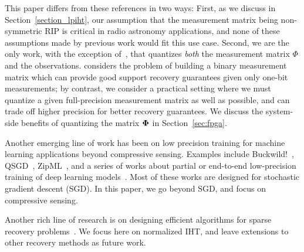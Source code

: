 \documentclass{article}
\begin{document}
{This paper differs from these references
in two ways: First, as we discuss in Section~\ref{section_lpiht},
our assumption that the measurement matrix being
non-symmetric RIP is critical in radio astronomy applications, 
and none of these assumptions made by previous work would fit  this use case. Second, we are the only work,
with the exception of~\cite{gopi20131bitcs}, that quantizes
{\em both} the measurement matrix $\Phi$ and the observations.
\cite{gopi20131bitcs} considers the problem of building a  binary measurement matrix which can provide good support recovery guarantees given only one-bit measurements; by contrast, we consider a practical setting where we must quantize a given full-precision measurement matrix as well as possible, and can trade off higher precision for better recovery guarantees. 
We discuss the system-side benefits  
of quantizing the matrix ${\bf \Phi}$ in Section~\ref{sec:fpga}. 

} 



Another emerging line of work has been on low precision training for 
machine learning applications beyond compressive
sensing. Examples include Buckwild!~\cite{desa2015hogwild},
QSGD~\cite{alistarh2016qsgd},  
ZipML~\cite{zhang2017zipml}, and
a series of works about 
partial or end-to-end low-precision training 
of deep learning models~\cite{seide2014sgd1bit, hubara2016qsnn, rastegari2016binarycnn,zhou2016cnn, miyashita2016cnn, li2016twn, gupta2015dl}.
Most of these works are designed for stochastic gradient descent (SGD). In this paper, we 
go beyond SGD, and focus on  compressive sensing.



Another rich line of research is on 
designing efficient algorithms for sparse recovery problems~\cite{blumensath2011aiht, wei2015fiht, blanchard2013iht, cevher2011ht, liu2017dualiht}. We focus here on normalized IHT, and leave extensions to other recovery methods as future work.
\end{document}
